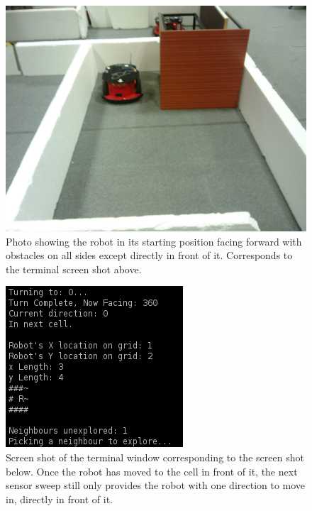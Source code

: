 \documentclass[a4paper,12pt]{article}
\begin{document}
\begin{figure}[H]
\includegraphics[scale=0.13]{RealS1.jpg}
\caption{Photo showing the robot in its starting position facing forward with obstacles on all sides except directly in front of it. Corresponds to the terminal screen shot above.}
\end{figure}

\begin{figure}[H]
\includegraphics[scale=1.0]{RealRunT2.png}
\caption{Screen shot of the terminal window corresponding to the screen shot below. Once the robot has moved to the cell in front of it, the next sensor sweep still only provides the robot with one direction to move in, directly in front of it.}
\end{figure}
\end{document}
